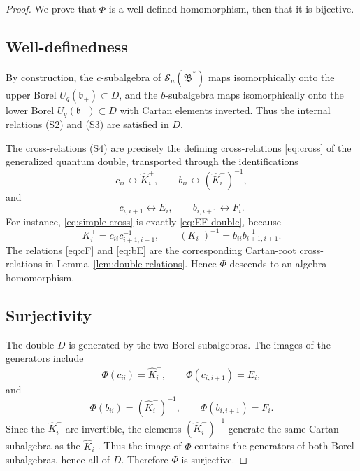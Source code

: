 \documentclass[11pt]{article}
\newcommand{\bcS}{\mathcal S}
\newcommand{\fB}{\mathfrak B}
\newcommand{\fb}{\mathfrak b}
\newcommand{\Khat}{\widehat K}
\begin{document}
\begin{proof}
We prove that \(\Phi\) is a well-defined homomorphism, then that it is bijective.

\subsection*{Well-definedness}
By construction, the \(c\)-subalgebra of \(\bcS_n(\fB^*)\) maps isomorphically onto the upper Borel \(U_q(\fb_+)\subset D\), and the \(b\)-subalgebra maps isomorphically onto the lower Borel \(U_q(\fb_-)\subset D\) with Cartan elements inverted.  Thus the internal relations (S2) and (S3) are satisfied in \(D\).

The cross-relations (S4) are precisely the defining cross-relations \eqref{eq:cross} of the generalized quantum double, transported through the identifications
\[
c_{ii}\leftrightarrow \Khat_i^+,\qquad
b_{ii}\leftrightarrow(\Khat_i^-)^{-1},
\]
and
\[
c_{i,i+1}\leftrightarrow E_i,\qquad
b_{i,i+1}\leftrightarrow F_i.
\]
For instance, \eqref{eq:simple-cross} is exactly \eqref{eq:EF-double}, because
\[
K_i^+=c_{ii}c_{i+1,i+1}^{-1},\qquad
(K_i^-)^{-1}=b_{ii}b_{i+1,i+1}^{-1}.
\]
The relations \eqref{eq:cF} and \eqref{eq:bE} are the corresponding Cartan-root cross-relations in Lemma~\ref{lem:double-relations}.  Hence \(\Phi\) descends to an algebra homomorphism.

\subsection*{Surjectivity}
The double \(D\) is generated by the two Borel subalgebras.  The images of the generators include
\[
\Phi(c_{ii})=\Khat_i^+,\qquad
\Phi(c_{i,i+1})=E_i,
\]
and
\[
\Phi(b_{ii})=(\Khat_i^-)^{-1},\qquad
\Phi(b_{i,i+1})=F_i.
\]
Since the \(\Khat_i^-\) are invertible, the elements \((\Khat_i^-)^{-1}\) generate the same Cartan subalgebra as the \(\Khat_i^-\).  Thus the image of \(\Phi\) contains the generators of both Borel subalgebras, hence all of \(D\).  Therefore \(\Phi\) is surjective.


\end{proof}
\end{document}
